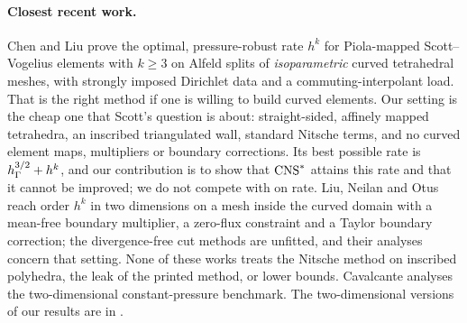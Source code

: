 \paragraph{Closest recent work.} Chen and Liu \cite{ChenLiu2026} prove the optimal, pressure-robust rate $h^k$ for Piola-mapped Scott--Vogelius elements with $k\ge3$ on Alfeld splits of \emph{isoparametric} curved tetrahedral meshes, with strongly imposed Dirichlet data and a commuting-interpolant load. That is the right method if one is willing to build curved elements. Our setting is the cheap one that Scott's question is about: straight-sided, affinely mapped tetrahedra, an inscribed triangulated wall, standard Nitsche terms, and no curved element maps, multipliers or boundary corrections. Its best possible rate is $h_\Gamma^{3/2}+h^k$, and our contribution is to show that $\mathrm{CNS}^\ast$ attains this rate and that it cannot be improved; we do not compete with \cite{ChenLiu2026} on rate. Liu, Neilan and Otus \cite{LiuNeilanOtus2023} reach order $h^k$ in two dimensions on a mesh inside the curved domain with a mean-free boundary multiplier, a zero-flux constraint and a Taylor boundary correction; the divergence-free cut methods \cite{LiuNeilanOlshanskii2023,FrachonNilssonZahedi2024,BurmanHansboLarson2024} are unfitted, and their analyses concern that setting. None of these works treats the Nitsche method on inscribed polyhedra, the leak of the printed method, or lower bounds. Cavalcante \cite{Cavalcante} analyses the two-dimensional constant-pressure benchmark. The two-dimensional versions of our results are in \cite{PadhiLong2D}.

